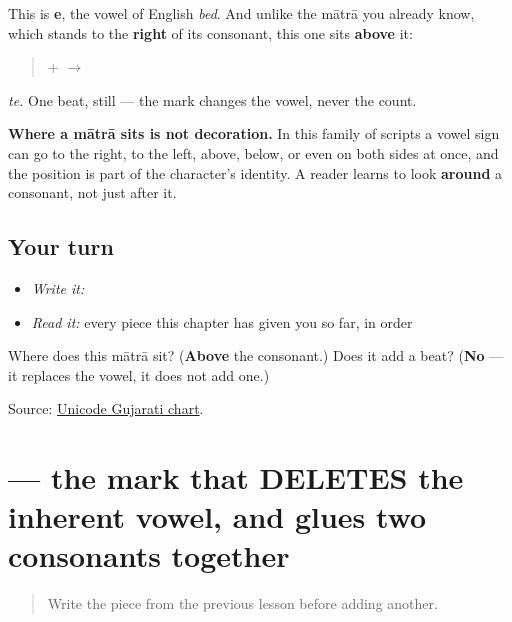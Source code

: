 \begin{quote}
\end{quote}

This is \textbf{e}, the vowel of English \emph{bed}. And unlike the mātrā you already know, which stands to the \textbf{right} of its consonant, this one sits \textbf{above} it:

\begin{quote}
\textbf{} + \textbf{} $\to$ \textbf{}
\end{quote}

\emph{te.} One beat, still — the mark changes the vowel, never the count.

\textbf{Where a mātrā sits is not decoration.} In this family of scripts a vowel sign can go to the right, to the left, above, below, or even on both sides at once, and the position is part of the character's identity. A reader learns to look \textbf{around} a consonant, not just after it.

\subsection*{Your turn}
\begin{itemize}
\raggedright
  \item \emph{Write it:} 
  \item \emph{Read it:} every piece this chapter has given you so far, in order
\end{itemize}

\begin{tcolorbox}[breakable,colback=teal!4,colframe=teal!35!black,title={Before you move on}]
Where does this mātrā sit? (\textbf{Above} the consonant.) Does it add a beat? (\textbf{No} — it replaces the vowel, it does not add one.)

Source: \href{https://www.unicode.org/charts/PDF/U0A80.pdf}{Unicode Gujarati chart}.
\end{tcolorbox}
\section[(virama)]{ — the mark that DELETES the inherent vowel, and glues two consonants together}

\label{lesson:GU-W01-virama}



\begin{quote}
Write the piece from the previous lesson before adding another.
\end{quote}


